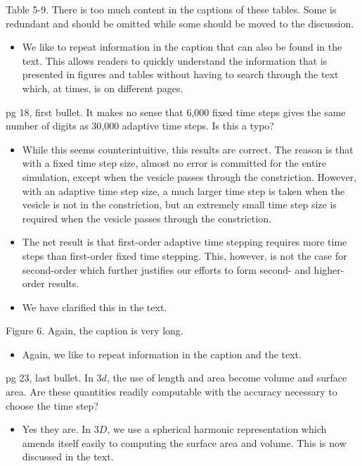 \documentclass[12pt]{article}
\newcommand{\comment}[1]{{\color{blue} #1}}
\begin{document}
\comment{Table 5-9. There is too much content in the captions of these
tables. Some is redundant and should be omitted while some should be
moved to the discussion.}
\begin{itemize}
  \item We like to repeat information in the caption that can also be
  found in the text.  This allows readers to quickly understand the
  information that is presented in figures and tables without having to
  search through the text which, at times, is on different pages.
\end{itemize}

\comment{pg 18, first bullet. It makes no sense that 6,000 fixed time
steps gives the same number of digits as 30,000 adaptive time steps. Is
this a typo?}
\begin{itemize}
  \item While this seems counterintuitive, this results are correct.
  The reason is that with a fixed time step size, almost no error is
  committed for the entire simulation, except when the vesicle passes
  through the constriction.  However, with an adaptive time step size, a
  much larger time step is taken when the vesicle is not in the
  constriction, but an extremely small time step size is required when
  the vesicle passes through the constriction.

  \item The net result is that first-order adaptive time stepping
  requires more time steps than first-order fixed time stepping.  This,
  however, is not the case for second-order which further justifies our
  efforts to form second- and higher-order results.

  \item We have clarified this in the text.
\end{itemize}

\comment{Figure 6. Again, the caption is very long.}
\begin{itemize}
  \item Again, we like to repeat information in the caption and the
  text.
\end{itemize}

\comment{pg 23, last bullet. In $3d$, the use of length and area become
volume and surface area. Are these quantities readily computable with
the accuracy necessary to choose the time step?}
\begin{itemize}
  \item Yes they are.  In $3D$, we use a spherical harmonic
  representation which amends itself easily to computing the surface
  area and volume.  This is now discussed in the text.
\end{itemize}
\end{document}
